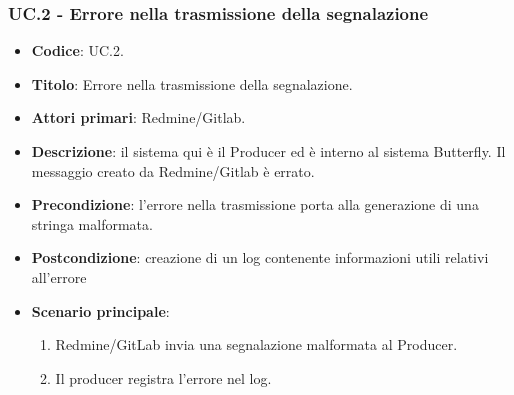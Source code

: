 \subsubsection{UC\theuccount.2 - Errore nella trasmissione della segnalazione}
	\begin{itemize}
		\item \textbf{Codice}: UC\theuccount.2.
		\item \textbf{Titolo}: Errore nella trasmissione della segnalazione.
		\item \textbf{Attori primari}: Redmine/Gitlab.
		\item \textbf{Descrizione}: il sistema qui è il Producer ed è interno al sistema Butterfly. Il messaggio creato da Redmine/Gitlab è errato.
		\item \textbf{Precondizione}: l'errore nella trasmissione porta alla generazione di una stringa malformata.
		\item \textbf{Postcondizione}: creazione di un log contenente informazioni utili relativi all'errore
		\item \textbf{Scenario principale}:
		\begin{enumerate}
			\item Redmine/GitLab invia una segnalazione malformata al Producer.
			\item Il producer registra l'errore nel log.
		\end{enumerate}
	\end{itemize}

